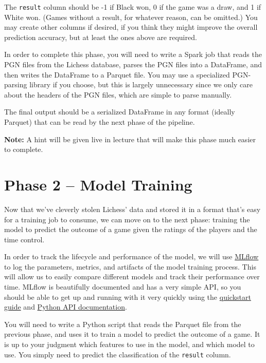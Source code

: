 \documentclass{article}
\begin{document}
The \texttt{result} column should be -1 if Black won, 0 if the game was a draw, and 1 if White won. (Games without a result, for whatever reason, can be omitted.) You may create other columns if desired, if you think they might improve the overall prediction accuracy, but at least the ones above are required.

In order to complete this phase, you will need to write a Spark job that reads the PGN files from the Lichess database, parses the PGN files into a DataFrame, and then writes the DataFrame to a Parquet file. You may use a specialized PGN-parsing library if you choose, but this is largely unnecessary since we only care about the headers of the PGN files, which are simple to parse manually.

The final output should be a serialized DataFrame in any format (ideally Parquet) that can be read by the next phase of the pipeline.

\textbf{Note: } A hint will be given live in lecture that will make this phase much easier to complete.

\section*{Phase 2 – Model Training}

Now that we've cleverly stolen Lichess' data and stored it in a format that's easy for a
training job to consume, we can move on to the next phase: training the model to predict
the outcome of a game given the ratings of the players and the time control.

In order to track the lifecycle and performance of the model, we will use \href{https://mlflow.org}{MLflow} to log the
parameters, metrics, and artifacts of the model training process. This will allow us to
easily compare different models and track their performance over time. MLflow is beautifully
documented and has a very simple API, so you should be able to get up and running with it
very quickly using the \href{https://mlflow.org/docs/latest/getting-started/intro-quickstart/index.html}{quickstart guide} and
\href{https://mlflow.org/docs/latest/python_api/mlflow.html}{Python API documentation}.

You will need to write a Python script that reads the Parquet file from the previous phase, and
uses it to train a model to predict the outcome of a game. It is up to your judgment which features
to use in the model, and which model to use. You simply need to predict the classification of the 
\texttt{result} column.
\end{document}
